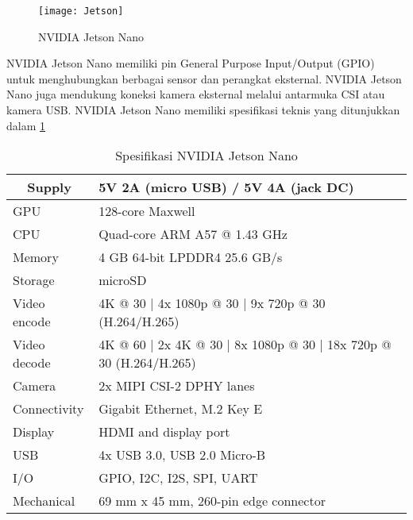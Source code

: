 \begin{figure}[H]
	\centering
	\texttt{[image: Jetson]}
	\caption{NVIDIA Jetson Nano}
	\label{fig:jetson}
\end{figure}

NVIDIA Jetson Nano memiliki pin General Purpose Input/Output (GPIO) untuk menghubungkan berbagai sensor dan perangkat eksternal. NVIDIA Jetson Nano juga mendukung koneksi kamera eksternal melalui antarmuka CSI atau kamera USB. NVIDIA Jetson Nano memiliki spesifikasi teknis yang ditunjukkan dalam \cref{tab:jetson-nano}	

\begin{table}[H]
	\caption{Spesifikasi NVIDIA Jetson Nano}
	\label{tab:jetson-nano}
	\centering
	\begin{tabular}{|l|l|}
		\hline
		\multicolumn{1}{|c|}{Supply} & 5V 2A (micro USB) / 5V 4A (jack DC)                                \\ \hline
		GPU                          & 128-core Maxwell                                                   \\ \hline
		CPU                          & Quad-core ARM A57 @ 1.43 GHz                                       \\ \hline
		Memory                       & 4 GB 64-bit LPDDR4 25.6 GB/s                                       \\ \hline
		Storage                      & microSD                                                            \\ \hline
		Video encode                 & 4K @ 30 | 4x 1080p @ 30 | 9x 720p @ 30 (H.264/H.265)               \\ \hline
		Video decode                 & 4K @ 60 | 2x 4K @ 30 | 8x 1080p @ 30 | 18x 720p @ 30 (H.264/H.265) \\ \hline
		Camera                       & 2x MIPI CSI-2 DPHY lanes                                           \\ \hline
		Connectivity                 & Gigabit Ethernet, M.2 Key E                                        \\ \hline
		Display                      & HDMI and display port                                              \\ \hline
		USB                          & 4x USB 3.0, USB 2.0 Micro-B                                        \\ \hline
		I/O                          & GPIO, I2C, I2S, SPI, UART                                          \\ \hline
		Mechanical                   & 69 mm x 45 mm, 260-pin edge connector                              \\ \hline
	\end{tabular}
\end{table}

